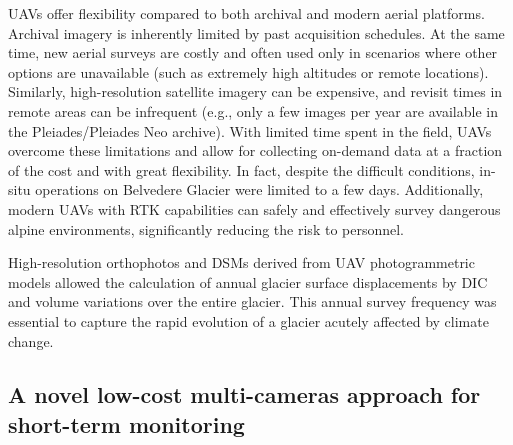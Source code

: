 UAVs offer flexibility compared to both archival and modern aerial platforms. 
Archival imagery is inherently limited by past acquisition schedules. 
At the same time, new aerial surveys are costly and often used only in scenarios where other options are unavailable (such as extremely high altitudes or remote locations). 
Similarly, high-resolution satellite imagery can be expensive, and revisit times in remote areas can be infrequent (e.g., only a few images per year are available in the Pleiades/Pleiades Neo archive).
With limited time spent in the field, UAVs overcome these limitations and allow for collecting on-demand data at a fraction of the cost and with great flexibility.
In fact, despite the difficult conditions, in-situ operations on Belvedere Glacier were limited to a few days. 
Additionally, modern UAVs with RTK capabilities can safely and effectively survey dangerous alpine environments, significantly reducing the risk to personnel.

High-resolution orthophotos and DSMs derived from UAV photogrammetric models allowed the calculation of annual glacier surface displacements by DIC and volume variations over the entire glacier.
This annual survey frequency was essential to capture the rapid evolution of a glacier acutely affected by climate change. 

\subsection*{A novel low-cost multi-cameras approach for short-term monitoring}

